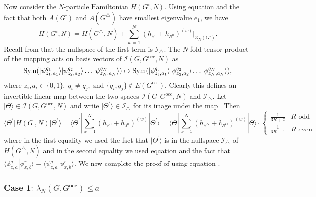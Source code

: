 \documentclass[../thesis-main/thesis-main]{subfiles}
\begin{document}
Now consider the $N$-particle Hamiltonian $H(G^{\square},N)$. Using equation  and the fact that both $A(G^{\square})$ and $A(G^{\triangle})$ have smallest eigenvalue $e_{1}$, we have
\[
H(G^{\square},N)=H(G^{\triangle},N)+\sum_{w=1}^{N}\left(h_{\mathcal{E}^{0}}+h_{\mathcal{S}^{0}}\right)^{(w)}\bigg|_{\mathcal{Z}_{N}(G^{\square})}.
\]
Recall from  that the nullspace of the first term is $\mathcal{I}_{\triangle}$. The $N$-fold tensor product of the mapping  acts on basis vectors of $\mathcal{I}(G,G^{\text{occ}},N)$ as 
\begin{equation}
\operatorname{Sym}(|\psi_{z_{1},a_{1}}^{q_{1}}\rangle|\psi_{z_{2},a_{2}}^{q_{2}}\rangle\ldots|\psi_{z_{N},a_{N}}^{q_{N}}\rangle)
\mapsto
\operatorname{Sym}(|\phi_{z_{1},a_{1}}^{q_{1}}\rangle|\phi_{z_{2},a_{2}}^{q_{2}}\rangle\ldots|\phi_{z_{N},a_{N}}^{q_{N}}\rangle),
\label{eq:N_particle_mapping}
\end{equation}
where $z_{i},a_{i}\in\{0,1\},\; q_{i}\neq q_{j},\;\text{and }\{q_{i},q_{j}\}\notin E(G^{\text{occ}})$.
Clearly this defines an invertible linear map between the two spaces
$\mathcal{I}(G,G^{\text{occ}},N)$ and $\mathcal{I}_{\triangle}$. Let $|\Theta\rangle\in\mathcal{I}(G,G^{\text{occ}},N)$
and write $|\Theta^{\prime}\rangle\in\mathcal{I}_{\triangle}$ for its image under the map . Then 
\begin{equation}
\langle\Theta^{\prime}|H(G^{\square},N)|\Theta^{\prime}\rangle=\langle\Theta^{\prime}|\sum_{w=1}^{N}\left(h_{\mathcal{E}^{0}}+h_{\mathcal{S}^{0}}\right)^{(w)}|\Theta^{\prime}\rangle=\langle\Theta|\sum_{w=1}^{N}\left(h_{\mathcal{E}^{G}}+h_{\mathcal{S}^{G}}\right)^{(w)}|\Theta\rangle\cdot\begin{cases}
\frac{1}{3R+2} & R\text{ odd}\\
\frac{1}{3R-1} & R\text{ even}
\end{cases}\label{eq:Theta_Theta_prime_eqn}
\end{equation}
where in the first equality we used the fact that $|\Theta^\prime\rangle$ is in the nullspace $\mathcal{I}_{\triangle}$ of $H(G^\triangle,N)$ and in the second equality we used equation  and the fact that $\langle\phi_{z,a}^{q}|\phi_{x,b}^{r}\rangle=\langle\psi_{z,a}^{q}|\psi_{x,b}^{r}\rangle$. We now complete the proof of  using equation .

\subsubsection*{Case 1: $\lambda_{N}(G,G^{\text{occ}})\leq a$}
\end{document}
